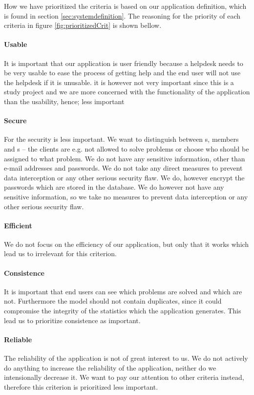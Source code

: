 How we have prioritized the criteria is based on our application definition, which is found in section \ref{sec:systemdefinition}. The reasoning for the priority of each criteria in figure \ref{fig:prioritizedCrit} is shown bellow.

\paragraph{Usable}

It is important that our application is user friendly because a helpdesk needs to be very usable to ease the process of getting help and the end user will not use the helpdesk if it is unusable.
it is however not very important since this is a study project and we are more concerned with the functionality of the application than the usability, hence; less important 
\paragraph{Secure}
For the \hdesk[] security is less important. We want to distinguish between \aclient[]s, \astaff[] members and \admin[]s -- the clients are e.g. not allowed to solve problems or choose who should be assigned to what problem.
We do not have any sensitive information, other than e-mail addresses and passwords. We do not take any direct measures to prevent data interception or any other serious security flaw. We do, however encrypt the passwords which are stored in the database.
We do however not have any sensitive information, so we take no measures to prevent data interception or any other serious security flaw.
\paragraph{Efficient}
We do not focus on the efficiency of our application, but only that it works which lead us to irrelevant for this criterion.
\paragraph{Consistence}
It is important that end users can see which problems are solved and which are not.
Furthermore the model should not contain duplicates, since it could compromise the integrity of the statistics which the application generates.
This lead us to prioritize consistence as important.
\paragraph{Reliable}
The reliability of the \hdesk[] application is not of great interest to us.
We do not actively do anything to increase the reliability of the application, neither do we intensionally decrease it.
We want to pay our attention to other criteria instead, therefore this criterion is prioritized less important.
